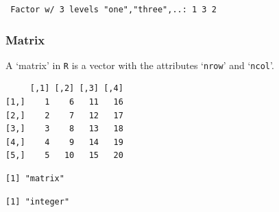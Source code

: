\begin{verbatim}
 Factor w/ 3 levels "one","three",..: 1 3 2
\end{verbatim}

\hypertarget{matrix}{%
\subsubsection{Matrix}\label{matrix}}

A `matrix' in \texttt{R} is a vector with the attributes `\texttt{nrow}'
and `\texttt{ncol}'.

\begin{Shaded}
\begin{Highlighting}[]
\StringTok{ }\NormalTok{(}\OperatorTok{:}\NormalTok{, } \NormalTok{, } \NormalTok{)}
\end{Highlighting}
\end{Shaded}

\begin{verbatim}
     [,1] [,2] [,3] [,4]
[1,]    1    6   11   16
[2,]    2    7   12   17
[3,]    3    8   13   18
[4,]    4    9   14   19
[5,]    5   10   15   20
\end{verbatim}

\begin{Shaded}
\begin{Highlighting}[]
\end{Highlighting}
\end{Shaded}

\begin{verbatim}
[1] "matrix"
\end{verbatim}

\begin{Shaded}
\begin{Highlighting}[]
\end{Highlighting}
\end{Shaded}

\begin{verbatim}
[1] "integer"
\end{verbatim}

\begin{Shaded}
\begin{Highlighting}[]
\end{Highlighting}
\end{Shaded}

